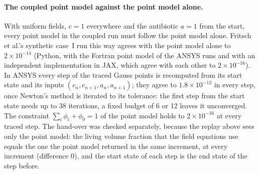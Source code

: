 
\paragraph{The coupled point model against the point model alone.}
With uniform fields, $c=1$ everywhere and the antibiotic $a=1$ from the start, every point model in the
coupled run must follow the point model alone. Fritsch et al.'s synthetic case~I
\cite{Fritsch2025BayesianMicrofilms} run this way agrees with the point model alone to $2\times10^{-14}$
(Python, with the Fortran point model of the ANSYS runs and with an independent implementation in JAX,
which agree with each other to $2\times10^{-16}$). In ANSYS every step of the traced Gauss points is
recomputed from its start state and its inputs $(c_n,c_{n+1},a_n,a_{n+1})$; they agree to
$1.8\times10^{-12}$ in every step, once Newton's method is iterated to its tolerance: the first step from
the start state needs up to 38 iterations, a fixed budget of 6 or 12 leaves it unconverged. The constraint
$\sum_i\phi_i+\phi_0=1$ of the point model holds to $2\times10^{-16}$ at every traced step.
The hand-over was checked separately, because the replay above sees only the point model: the living volume
fraction that the field equations use equals the one the point model returned in the same increment, at every
increment (difference $0$), and the start state of each step is the end state of the step before.


